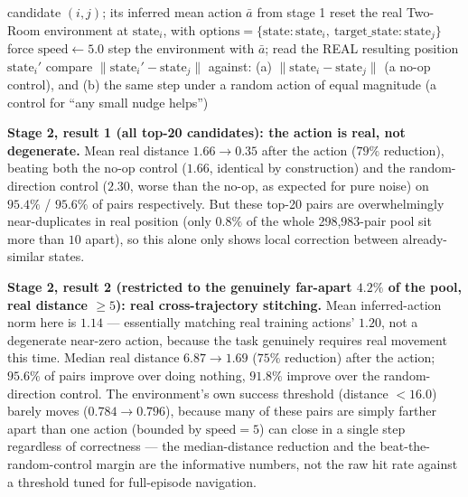 \documentclass[11pt]{article}
\begin{document}
\begin{algorithm}[H]
\caption{E2 stage 2: ground-truth environment verification}
\label{alg:e2-env}
\begin{algorithmic}[1]
\Require candidate $(i,j)$; its inferred mean action $\bar a$ from stage 1
\State reset the real Two-Room environment at $\mathrm{state}_i$, with
$\mathrm{options}=\{\text{state}: \mathrm{state}_i,\ \text{target\_state}: \mathrm{state}_j\}$
\State force $\mathrm{speed} \gets 5.0$ 
\State step the environment with $\bar a$; read the REAL resulting position
$\mathrm{state}_i'$
\State compare $\|\mathrm{state}_i' - \mathrm{state}_j\|$ against: (a) $\|\mathrm{state}_i -
\mathrm{state}_j\|$ (a no-op control), and (b) the same step under a random action of equal
magnitude (a control for ``any small nudge helps'')
\end{algorithmic}
\end{algorithm}

\textbf{Stage 2, result 1 (all top-20 candidates): the action is real, not degenerate.} Mean
real distance $1.66 \to 0.35$ after the action ($79\%$ reduction), beating both the no-op
control ($1.66$, identical by construction) and the random-direction control ($2.30$, worse
than the no-op, as expected for pure noise) on $95.4\%$ / $95.6\%$ of pairs respectively. But
these top-20 pairs are overwhelmingly near-duplicates in real position (only $0.8\%$ of the
whole 298{,}983-pair pool sit more than $10$ apart), so this alone only shows local
correction between already-similar states.

\textbf{Stage 2, result 2 (restricted to the genuinely far-apart $4.2\%$ of the pool, real
distance $\ge 5$): real cross-trajectory stitching.} Mean inferred-action norm here is
$1.14$ --- essentially matching real training actions' $1.20$, not a degenerate near-zero
action, because the task genuinely requires real movement this time. Median real distance
$6.87 \to 1.69$ ($75\%$ reduction) after the action; $95.6\%$ of pairs improve over doing
nothing, $91.8\%$ improve over the random-direction control. The environment's own success
threshold (distance $<16.0$) barely moves ($0.784 \to 0.796$), because many of these pairs
are simply farther apart than one action (bounded by $\mathrm{speed}=5$) can close in a
single step regardless of correctness --- the median-distance reduction and the
beat-the-random-control margin are the informative numbers, not the raw hit rate against a
threshold tuned for full-episode navigation.
\end{document}
